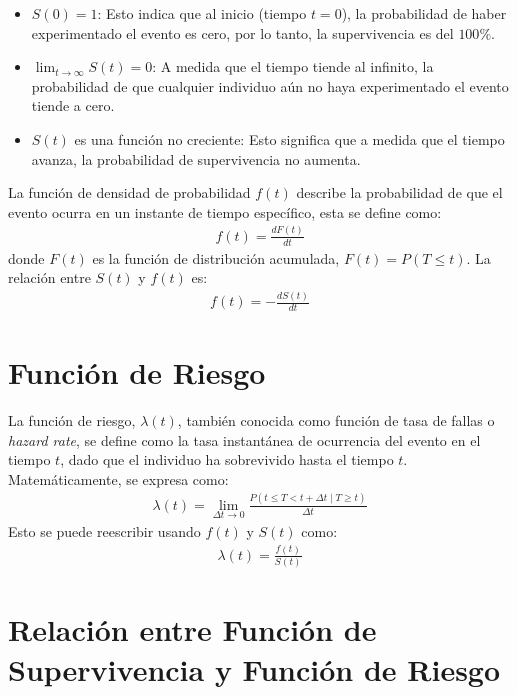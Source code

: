 \documentclass[a4paper]{report} %
\begin{document}
\begin{itemize}
    \item $S(0) = 1$: Esto indica que al inicio (tiempo $t=0$), la probabilidad de haber experimentado el evento es cero, por lo tanto, la supervivencia es del $100\%$.
    \item $\lim_{t \to \infty} S(t) = 0$: A medida que el tiempo tiende al infinito, la probabilidad de que cualquier individuo a\'un no haya experimentado el evento tiende a cero.
    \item $S(t)$ es una funci\'on no creciente: Esto significa que a medida que el tiempo avanza, la probabilidad de supervivencia no aumenta.
\end{itemize}

La funci\'on de densidad de probabilidad $f(t)$ describe la probabilidad de que el evento ocurra en un instante de tiempo espec\'ifico, esta se define como:
\begin{eqnarray}
f(t) = \frac{dF(t)}{dt}
\end{eqnarray}
donde $F(t)$ es la funci\'on de distribuci\'on acumulada, $F(t) = P(T \leq t)$. La relaci\'on entre $S(t)$ y $f(t)$ es:
\begin{eqnarray}
f(t) = -\frac{dS(t)}{dt}
\end{eqnarray}
\section*{Funci\'on de Riesgo}

La funci\'on de riesgo, $\lambda(t)$, tambi\'en conocida como funci\'on de tasa de fallas o \textit{hazard rate}, se define como la tasa instant\'anea de ocurrencia del evento en el tiempo $t$, dado que el individuo ha sobrevivido hasta el tiempo $t$. Matem\'aticamente, se expresa como:
\begin{eqnarray}
\lambda(t) = \lim_{\Delta t \to 0} \frac{P(t \leq T < t + \Delta t \mid T \geq t)}{\Delta t}
\end{eqnarray}
Esto se puede reescribir usando $f(t)$ y $S(t)$ como:
\begin{eqnarray}
\lambda(t) = \frac{f(t)}{S(t)}
\end{eqnarray}

\section*{Relaci\'on entre Funci\'on de Supervivencia y Funci\'on de Riesgo}
\end{document}
